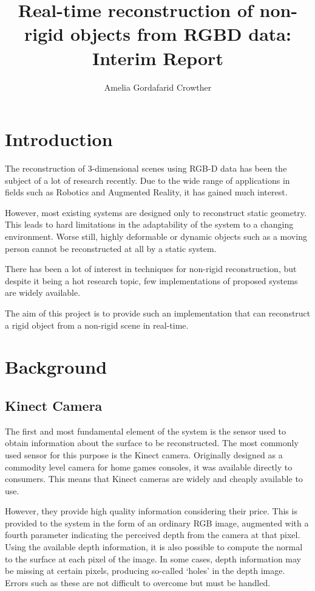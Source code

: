 \documentclass[a4paper]{article}
\title{Real-time reconstruction of non-rigid objects from RGBD data: Interim Report}
\author{Amelia Gordafarid Crowther}
\begin{document}
\maketitle
\section{Introduction}

The reconstruction of 3-dimensional scenes using RGB-D data has been the subject of a lot of research recently. Due to the wide range of applications in fields such as Robotics and Augmented Reality, it has gained much interest.

However, most existing systems are designed only to reconstruct static geometry. This leads to hard limitations in the adaptability of the system to a changing environment. Worse still, highly deformable or dynamic objects such as a moving person cannot be reconstructed at all by a static system.

There has been a lot of interest in techniques for non-rigid reconstruction, but despite it being a hot research topic, few implementations of proposed systems are widely available. 

The aim of this project is to provide such an implementation that can reconstruct a rigid object from a  non-rigid scene in real-time.


\section{Background}

\subsection{Kinect Camera}

The first and most fundamental element of the system is the sensor used to obtain information about the surface to be reconstructed. The most commonly used sensor for this purpose is the Kinect camera. Originally designed as a commodity level camera for home games consoles, it was available directly to consumers. This means that Kinect cameras are widely and cheaply available to use.

However, they provide high quality information considering their price. This is provided to the system in the form of an ordinary RGB image, augmented with a fourth parameter indicating the perceived depth from the camera at that pixel. Using the available depth information, it is also possible to compute the normal to the surface at each pixel of the image. In some cases, depth information may be missing at certain pixels, producing so-called `holes' in the depth image. Errors such as these are not difficult to overcome but must be handled.
\end{document}
